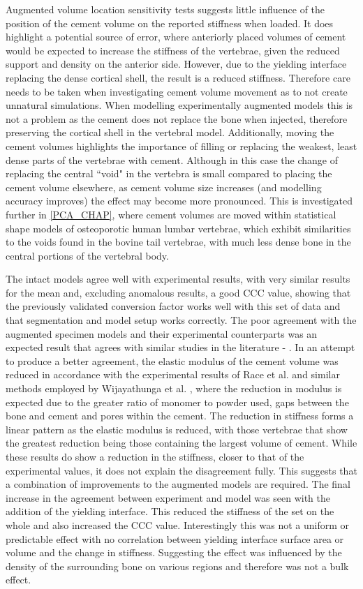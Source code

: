 Augmented volume location sensitivity tests suggests little influence of the
position of the cement volume on the reported stiffness when loaded.  It does
highlight a potential source of error, where anteriorly placed volumes of
cement would be expected to increase the stiffness of the vertebrae, given the
reduced support and density on the anterior side.  However, due to the yielding interface
replacing the dense cortical shell, the result is a reduced stiffness.
Therefore care needs to be taken when investigating cement volume movement as
to not create unnatural simulations.  When modelling experimentally augmented
models this is not a problem as the cement does not replace the bone
when injected, therefore preserving the cortical shell in the
vertebral model. Additionally, moving the cement volumes highlights the importance of
filling or replacing the weakest, least dense parts of the vertebrae with
cement.  Although in this case the change of replacing the central ``void" in
the vertebra is small compared to placing the cement volume elsewhere, as
cement volume size increases (and modelling accuracy improves) the effect may
become more pronounced.  This is investigated further in \cref{PCA_CHAP}, where
cement volumes are moved within statistical shape models of osteoporotic human
lumbar vertebrae, which exhibit similarities to the voids found in the bovine
tail vertebrae, with much less dense bone in the central portions of the
vertebral body.

The intact models agree well with experimental results, with very similar
results for the mean and, excluding anomalous results, a good CCC value,
showing that the previously validated conversion factor works well with this
set of data and that segmentation and model setup works correctly. The poor
agreement with the augmented specimen models and their experimental
counterparts was an expected result that agrees with similar studies in the
literature - \cite{Wijayathunga2008}. In an attempt to produce a better
agreement, the elastic modulus of the cement volume was reduced in accordance
with the experimental results of Race et al. \cite{Race2007} and similar
methods employed by Wijayathunga et al. \cite{Wijayathunga2008}, where the
reduction in modulus is expected due to the greater ratio of monomer to powder
used, gaps between the bone and cement and pores within the cement. The
reduction in stiffness forms a linear pattern as the elastic modulus is
reduced, with those vertebrae that show the greatest reduction being those
containing the largest volume of cement. While these results do show a
reduction in the stiffness, closer to that of the experimental values, it does
not explain the disagreement fully. This suggests that a combination of
improvements to the augmented models are required. The final increase in the
agreement between experiment and model was seen with the addition of the
yielding interface. This reduced the stiffness of the set on the whole and also
increased the CCC value. Interestingly this was not a uniform or predictable
effect with no correlation between yielding interface surface area or volume
and the change in stiffness. Suggesting the effect was influenced by the
density of the surrounding bone on various regions and therefore was not a bulk
effect.

